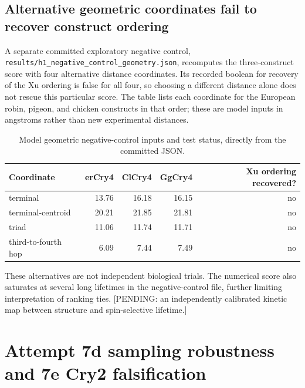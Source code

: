 \subsection{Alternative geometric coordinates fail to recover construct ordering}
A separate committed exploratory negative control, \texttt{results/h1\_negative\_control\_geometry.json}, recomputes the three-construct score with four alternative distance coordinates. Its recorded boolean for recovery of the Xu ordering is false for all four, so choosing a different distance alone does not rescue this particular score. The table lists each coordinate for the European robin, pigeon, and chicken constructs in that order; these are model inputs in angstroms rather than new experimental distances.
\begin{table}[!htbp]\centering\small\caption{Model geometric negative-control inputs and test status, directly from the committed JSON.}\begin{tabular}{lrrrr}\hline Coordinate & erCry4 & ClCry4 & GgCry4 & Xu ordering recovered? \\\hline
terminal & 13.76 & 16.18 & 16.15 & no \\
terminal-centroid & 20.21 & 21.85 & 21.81 & no \\
triad & 11.06 & 11.74 & 11.71 & no \\
third-to-fourth hop & 6.09 & 7.44 & 7.49 & no \\\hline\end{tabular}\end{table}
These alternatives are not independent biological trials. The numerical score also saturates at several long lifetimes in the negative-control file, further limiting interpretation of ranking ties. [PENDING: an independently calibrated kinetic map between structure and spin-selective lifetime.]

\section{Attempt 7d sampling robustness and 7e Cry2 falsification}
